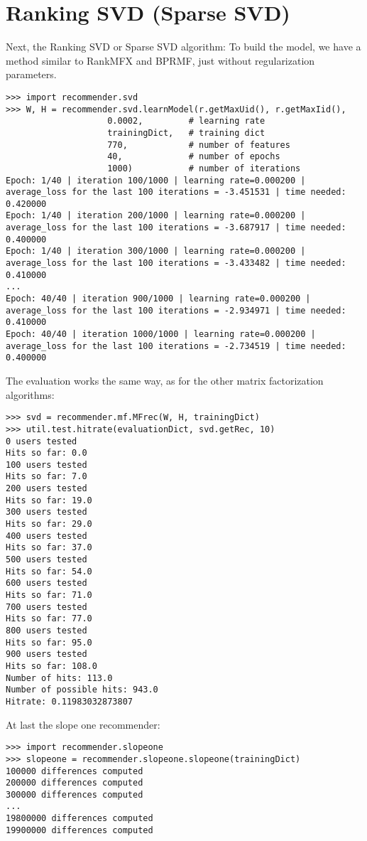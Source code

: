 \section{Ranking SVD (Sparse SVD)}
Next, the Ranking SVD or Sparse SVD algorithm: To build the model, we have 
a method similar to RankMFX and BPRMF, just without regularization parameters.
\begin{lstlisting}[style=python]
>>> import recommender.svd
>>> W, H = recommender.svd.learnModel(r.getMaxUid(), r.getMaxIid(),
                    0.0002,         # learning rate
                    trainingDict,   # training dict
                    770,            # number of features
                    40,             # number of epochs
                    1000)           # number of iterations
Epoch: 1/40 | iteration 100/1000 | learning rate=0.000200 | average_loss for the last 100 iterations = -3.451531 | time needed: 0.420000
Epoch: 1/40 | iteration 200/1000 | learning rate=0.000200 | average_loss for the last 100 iterations = -3.687917 | time needed: 0.400000
Epoch: 1/40 | iteration 300/1000 | learning rate=0.000200 | average_loss for the last 100 iterations = -3.433482 | time needed: 0.410000
...
Epoch: 40/40 | iteration 900/1000 | learning rate=0.000200 | average_loss for the last 100 iterations = -2.934971 | time needed: 0.410000
Epoch: 40/40 | iteration 1000/1000 | learning rate=0.000200 | average_loss for the last 100 iterations = -2.734519 | time needed: 0.400000
\end{lstlisting}
The evaluation works the same way, as for the other matrix factorization algorithms:
\begin{lstlisting}[style=python]
>>> svd = recommender.mf.MFrec(W, H, trainingDict)
>>> util.test.hitrate(evaluationDict, svd.getRec, 10)
0 users tested
Hits so far: 0.0
100 users tested
Hits so far: 7.0
200 users tested
Hits so far: 19.0
300 users tested
Hits so far: 29.0
400 users tested
Hits so far: 37.0
500 users tested
Hits so far: 54.0
600 users tested
Hits so far: 71.0
700 users tested
Hits so far: 77.0
800 users tested
Hits so far: 95.0
900 users tested
Hits so far: 108.0
Number of hits: 113.0
Number of possible hits: 943.0
Hitrate: 0.11983032873807
\end{lstlisting}

At last the slope one recommender:
\begin{lstlisting}[style=python]
>>> import recommender.slopeone
>>> slopeone = recommender.slopeone.slopeone(trainingDict)
100000 differences computed
200000 differences computed
300000 differences computed
...
19800000 differences computed
19900000 differences computed
\end{lstlisting}

